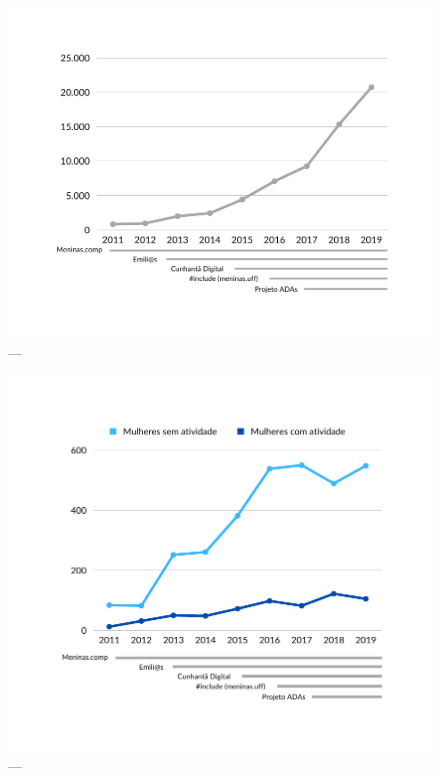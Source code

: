 \begin{figure}[H]
\centering
\includegraphics[width=1\textwidth]{Figuras/numeroalunosprojeto.png}
\caption{---}
\label{fig:numeroalunosprojeto}
\end{figure}


\begin{figure}[H]
\centering
\includegraphics[width=1\textwidth]{Figuras/atividadeextra.png}
\caption{---}
\label{fig:atividadeextra}
\end{figure}


